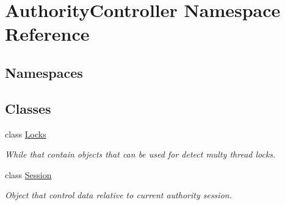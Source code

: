 \hypertarget{namespace_authority_controller}{}\section{Authority\+Controller Namespace Reference}
\label{namespace_authority_controller}
\subsection*{Namespaces}
\begin{DoxyCompactItemize}
\end{DoxyCompactItemize}
\subsection*{Classes}
\begin{DoxyCompactItemize}
\item 
class \mbox{\hyperlink{class_authority_controller_1_1_locks}{Locks}}
\begin{DoxyCompactList}\small\item\em While that contain objects that can be used for detect multy thread locks. \end{DoxyCompactList}\item 
class \mbox{\hyperlink{class_authority_controller_1_1_session}{Session}}
\begin{DoxyCompactList}\small\item\em Object that control data relative to current authority session. \end{DoxyCompactList}\end{DoxyCompactItemize}
